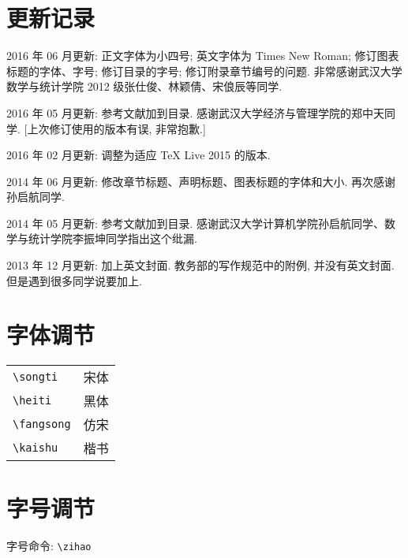 \documentclass[forprint]{WHUBachelor}
\begin{document}
\section{更新记录}
2016 年 06 月更新: 正文字体为小四号; 英文字体为 Times New Roman; 修订图表标题的字体、字号; 修订目录的字号; 修订附录章节编号的问题. 
                          非常感谢武汉大学数学与统计学院 2012 级张仕俊、林颖倩、宋俍辰等同学. 

2016 年 05 月更新: 参考文献加到目录. 感谢武汉大学经济与管理学院的郑中天同学. [上次修订使用的版本有误, 非常抱歉.]

2016 年 02 月更新: 调整为适应 TeX Live 2015 的版本.

2014 年 06 月更新: 修改章节标题、声明标题、图表标题的字体和大小. 再次感谢孙启航同学.

2014 年 05 月更新: 参考文献加到目录. 感谢武汉大学计算机学院孙启航同学、数学与统计学院李振坤同学指出这个纰漏.

2013 年 12 月更新: 加上英文封面. 教务部的写作规范中的附例, 并没有英文封面. 但是遇到很多同学说要加上.


 \section{字体调节}

\begin{tabular}{ll}
	\verb|\songti|   & {\songti 宋体}   \\
	\verb|\heiti|    & {\heiti 黑体}    \\
	\verb|\fangsong| & {\fangsong 仿宋} \\
	\verb|\kaishu|   & {\kaishu 楷书}
\end{tabular}


\section{字号调节}
字号命令: \verb|\zihao| 
\end{document}
